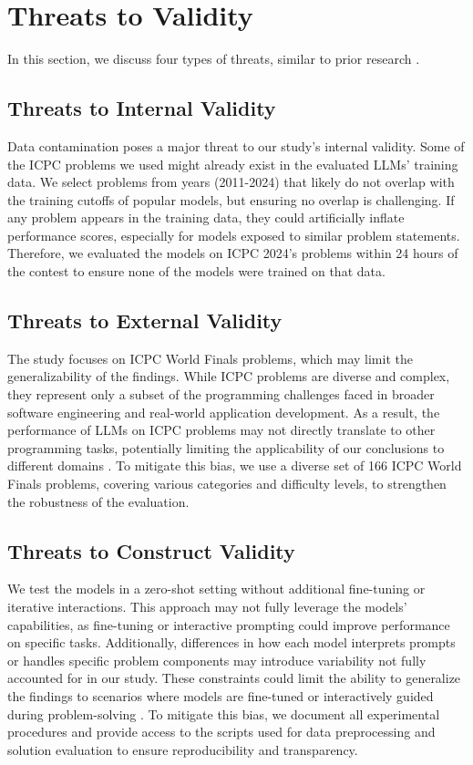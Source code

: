 \section{Threats to Validity}
In this section, we discuss four types of threats, similar to prior research \cite{pyreddy2025emoxpt}.
\subsection{Threats to Internal Validity}
Data contamination poses a major threat to our study’s internal validity. Some of the ICPC problems we used might already exist in the evaluated LLMs’ training data. We select
problems from years (2011-2024) that likely do not overlap with the training cutoffs of popular models, but ensuring no overlap is challenging. If any problem appears in the training data, they could artificially inflate performance scores, especially for models exposed to similar problem statements\cite{Xu2023Lemur}. Therefore, we evaluated the models on ICPC 2024's problems within 24 hours of the contest to ensure none of the models were trained on that data. 

\subsection{Threats to External Validity}
The study focuses on ICPC World Finals problems, which may limit the generalizability of the findings. While ICPC problems are diverse and complex, they represent only a subset of the programming challenges faced in broader software engineering and real-world application development. As a result, the performance of LLMs on ICPC problems may not directly translate to other programming tasks, potentially limiting the applicability of our conclusions to different domains \cite{b1,b2,b12}. To mitigate this bias, we use a diverse set of 166 ICPC World Finals problems, covering various categories and difficulty levels, to strengthen the robustness of the evaluation.

\subsection{Threats to Construct Validity}
We test the models in a zero-shot setting without additional fine-tuning or iterative interactions. This approach may not fully leverage the models’ capabilities, as fine-tuning or interactive prompting could improve performance on specific tasks. Additionally, differences in how each model interprets prompts or handles specific problem components may introduce variability not fully accounted for in our study. These constraints could limit the ability to generalize the findings to scenarios where models are fine-tuned or interactively guided during problem-solving \cite{b3,b4,b11}. To mitigate this bias, we document all experimental procedures and provide access to the scripts used for data preprocessing and solution evaluation to ensure reproducibility and transparency.

